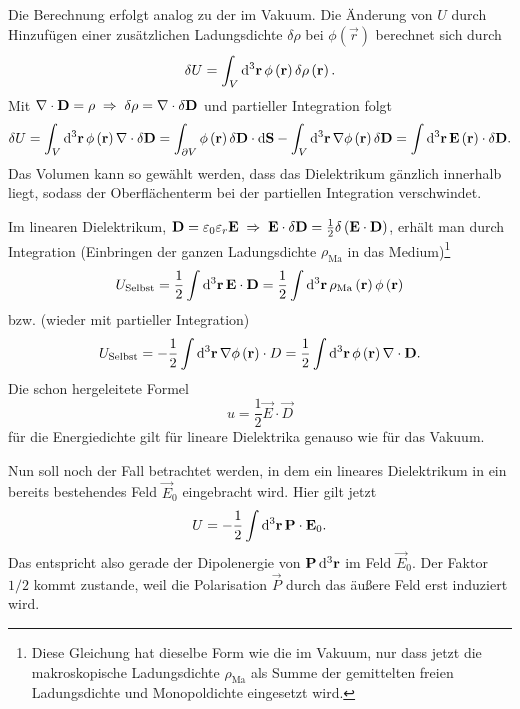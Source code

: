 Die Berechnung erfolgt analog zu der im Vakuum. Die Änderung von $U$ durch Hinzufügen einer zusätzlichen Ladungsdichte $\delta \rho $ bei $\phi \left(\vec {r}\right)$ berechnet sich durch
\begin{equation*}
	\delta U=\int _{V}\diffa[3]{\vec{r}}\phi \left(\vec {r}\right)\delta \rho \left(\vec {r}\right).
\end{equation*}
Mit $\nabla \cdot \vec {D}=\rho \implication \delta \rho =\nabla \cdot \delta \vec {D}$ und partieller Integration folgt
\begin{equation*}
	\delta U=\int _{V}\diffa[3]{\vec{r}}\phi \left(\vec {r}\right)\nabla \cdot \delta \vec {D}=\int _{\partial V}\phi \left(\vec {r}\right)\delta \vec {D}\cdot \diff \vec {S}-\int _{V}\diffa[3]{\vec{r}}\nabla \phi \left(\vec {r}\right)\delta \vec {D}=\int \diffa[3]{\vec{r}}\vec {E}\left(\vec {r}\right)\cdot \delta \vec {D}.
\end{equation*}
Das Volumen kann so gewählt werden, dass das Dielektrikum gänzlich innerhalb liegt, sodass der Oberflächenterm bei der partiellen Integration verschwindet.

Im linearen Dielektrikum, $\vec {D}=\varepsilon _{0}\varepsilon _{r}\vec {E}\implication \vec {E}\cdot \delta \vec {D}=\frac{1}{2}\delta \left(\vec {E}\cdot \vec {D}\right)$, erhält man durch Integration (Einbringen der ganzen Ladungsdichte $\rho _{\mathrm{Ma}}$ in das Medium)\footnote{Diese Gleichung hat dieselbe Form wie die im Vakuum, nur dass jetzt die makroskopische Ladungsdichte $\rho _{\mathrm{Ma}}$ als Summe der gemittelten freien Ladungsdichte und Monopoldichte eingesetzt wird. }
\begin{equation*}
	U_{\text{Selbst}}=\frac{1}{2}\int \diffa[3]{\vec{r}}\vec {E}\cdot \vec {D}=\frac{1}{2}\int \diffa[3]{\vec{r}}\rho _{\mathrm{Ma}}\left(\vec {r}\right)\phi \left(\vec {r}\right)
\end{equation*}
bzw. (wieder mit partieller Integration)
\begin{equation*}
	U_{\text{Selbst}}=-\frac{1}{2}\int \diffa[3]{\vec{r}}\nabla \phi \left(\vec {r}\right)\cdot D=\frac{1}{2}\int \diffa[3]{\vec{r}}\phi \left(\vec {r}\right)\nabla \cdot \vec {D}.
\end{equation*}
Die schon hergeleitete Formel
\begin{equation*}
	u=\frac{1}{2}\vec {E}\cdot \vec {D}
\end{equation*}
für die Energiedichte gilt für lineare Dielektrika genauso wie für das Vakuum.

Nun soll noch der Fall betrachtet werden, in dem ein lineares Dielektrikum in ein bereits bestehendes Feld $\vec {E}_{0}$ eingebracht wird. Hier gilt jetzt
\begin{equation*}
	U=-\frac{1}{2}\int \diffa[3]{\vec{r}}\vec {P}\cdot \vec {E}_{0}.
\end{equation*}
Das entspricht also gerade der Dipolenergie von $\vec P\diffa[3]{\vec{r}}$ im Feld $\vec {E}_{0}$. Der Faktor $1/2$ kommt zustande, weil die Polarisation $\vec {P}$ durch das äußere Feld erst induziert wird.


